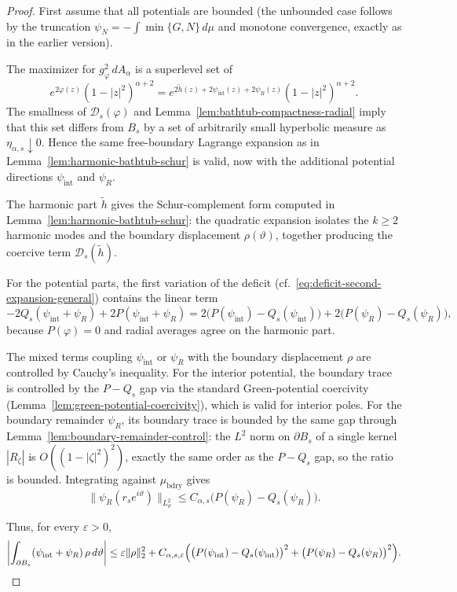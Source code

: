 \documentclass[a4paper,10pt]{amsart}
\begin{document}
\begin{proof}
First assume that all potentials are bounded (the unbounded case follows by
the truncation $\psi_N=-\int\min\{G,N\}\,d\mu$ and monotone convergence,
exactly as in the earlier version).

The maximizer for $g_\varphi^2\,dA_\alpha$ is a superlevel set of
\[
e^{2\varphi(z)}(1-|z|^2)^{\alpha+2}
=
e^{2\widetilde h(z)+2\psi_{\mathrm{int}}(z)+2\psi_R(z)}(1-|z|^2)^{\alpha+2}.
\]
The smallness of $\mathcal D_s(\varphi)$ and
Lemma~\ref{lem:bathtub-compactness-radial} imply that this set differs from
$B_s$ by a set of arbitrarily small hyperbolic measure as
$\eta_{\alpha,s}\downarrow0$.  Hence the same free-boundary Lagrange
expansion as in Lemma~\ref{lem:harmonic-bathtub-schur} is valid, now with
the additional potential directions $\psi_{\mathrm{int}}$ and $\psi_R$.

The harmonic part $\widetilde h$ gives the Schur-complement form computed in
Lemma~\ref{lem:harmonic-bathtub-schur}: the quadratic expansion isolates the
$k\ge2$ harmonic modes and the boundary displacement $\rho(\vartheta)$,
together producing the coercive term $\mathcal D_s(\widetilde h)$.

For the potential parts, the first variation of the deficit
(cf.\ \eqref{eq:deficit-second-expansion-general}) contains the linear term
\[
-2Q_s(\psi_{\mathrm{int}}+\psi_R)+2P(\psi_{\mathrm{int}}+\psi_R)
=2\bigl(P(\psi_{\mathrm{int}})-Q_s(\psi_{\mathrm{int}})\bigr)
+2\bigl(P(\psi_R)-Q_s(\psi_R)\bigr),
\]
because $P(\varphi)=0$ and radial averages agree on the harmonic part.

The mixed terms coupling $\psi_{\mathrm{int}}$ or $\psi_R$ with the
boundary displacement $\rho$ are controlled by Cauchy's inequality.
For the interior potential, the boundary trace is controlled by the
$P-Q_s$ gap via the standard Green-potential coercivity
(Lemma~\ref{lem:green-potential-coercivity}), which is valid for interior
poles.  For the boundary remainder $\psi_R$, its boundary trace is bounded
by the same gap through Lemma~\ref{lem:boundary-remainder-control}:
the $L^2$ norm on $\partial B_s$ of a single kernel $|R_\zeta|$ is
$O((1-|\zeta|^2)^2)$, exactly the same order as the $P-Q_s$ gap, so the
ratio is bounded.  Integrating against $\mu_{\mathrm{bdry}}$ gives
\[
\|\psi_R(r_se^{i\vartheta})\|_{L^2_\vartheta}
\le
C_{\alpha,s}\bigl(P(\psi_R)-Q_s(\psi_R)\bigr).
\]

Thus, for every $\varepsilon>0$,
\[
\left|\int_{\partial B_s}(\psi_{\mathrm{int}}+\psi_R)\,\rho\,d\vartheta\right|
\le
\varepsilon\|\rho\|_2^2
+C_{\alpha,s,\varepsilon}\Bigl(
\bigl(P(\psi_{\mathrm{int}})-Q_s(\psi_{\mathrm{int}})\bigr)^2
+\bigl(P(\psi_R)-Q_s(\psi_R)\bigr)^2\Bigr).
\]


\end{proof}
\end{document}

